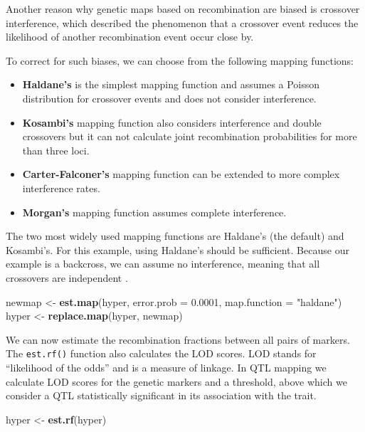\documentclass[12pt,]{krantz}
\newenvironment{Shaded}{\begin{snugshade}}{\end{snugshade}}
\newcommand{\KeywordTok}[1]{\textcolor[rgb]{0.27,0.27,0.27}{\textbf{{#1}}}}
\newcommand{\DataTypeTok}[1]{\textcolor[rgb]{0.27,0.27,0.27}{{#1}}}
\newcommand{\FloatTok}[1]{\textcolor[rgb]{0.06,0.06,0.06}{{#1}}}
\newcommand{\StringTok}[1]{\textcolor[rgb]{0.5,0.5,0.5}{{#1}}}
\newcommand{\NormalTok}[1]{{#1}}
\providecommand{\tightlist}{%
  \setlength{\itemsep}{0pt}\setlength{\parskip}{0pt}}
\theoremstyle{definition}
\theoremstyle{definition}
\theoremstyle{remark}
\begin{document}
Another reason why genetic maps based on recombination are biased is
crossover interference, which described the phenomenon that a crossover
event reduces the likelihood of another recombination event occur close
by.

To correct for such biases, we can choose from the following mapping
functions:

\begin{itemize}
\tightlist
\item
  \textbf{Haldane's} is the simplest mapping function and assumes a
  Poisson distribution for crossover events and does not consider
  interference.
\item
  \textbf{Kosambi's} mapping function also considers interference and
  double crossovers but it can not calculate joint recombination
  probabilities for more than three loci.
\item
  \textbf{Carter-Falconer's} mapping function can be extended to more
  complex interference rates.
\item
  \textbf{Morgan's} mapping function assumes complete interference.
\end{itemize}

The two most widely used mapping functions are Haldane's (the default)
and Kosambi's. For this example, using Haldane's should be sufficient.
Because our example is a backcross, we can assume no interference,
meaning that all crossovers are independent \citep{lynch1998genetics}.

\begin{Shaded}
\begin{Highlighting}[]
\NormalTok{newmap <-}\StringTok{ }\KeywordTok{est.map}\NormalTok{(hyper, }\DataTypeTok{error.prob =} \FloatTok{0.0001}\NormalTok{, }
                  \DataTypeTok{map.function =} \StringTok{"haldane"}\NormalTok{)}
\NormalTok{hyper <-}\StringTok{ }\KeywordTok{replace.map}\NormalTok{(hyper, newmap)}
\end{Highlighting}
\end{Shaded}

We can now estimate the recombination fractions between all pairs of
markers. The \texttt{est.rf()} function also calculates the LOD scores.
LOD stands for ``likelihood of the odds'' and is a measure of linkage.
In QTL mapping we calculate LOD scores for the genetic markers and a
threshold, above which we consider a QTL statistically significant in
its association with the trait.

\begin{Shaded}
\begin{Highlighting}[]
\NormalTok{hyper <-}\StringTok{ }\KeywordTok{est.rf}\NormalTok{(hyper)}
\end{Highlighting}
\end{Shaded}
\end{document}
